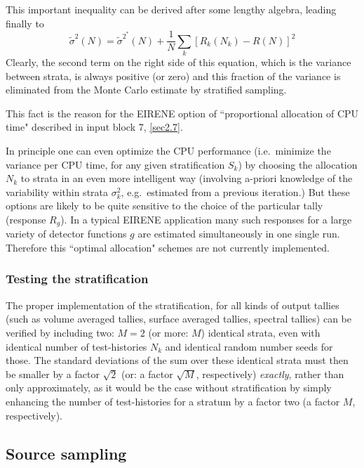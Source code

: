 This important inequality can be derived after some lengthy algebra, leading
finally to
\begin{equation}
  \tilde \sigma^{2}(N)=\tilde \sigma^{2^*}(N)+
  \frac{1}{N}\sum_k[ R_k(N_k)- R(N)]^2
\end{equation}
Clearly, the second term on
the right side of this equation, which is the variance between strata, is
always positive (or zero) and this fraction of the variance is eliminated from
the Monte Carlo estimate by stratified sampling.

This fact is the reason for the EIRENE option of ``proportional allocation of
CPU time" described in input block 7, \cref{sec2.7}.

In principle one can even optimize the CPU performance (i.e.\ minimize the
variance per CPU time, for any given stratification $S_k$) by choosing the
allocation $N_k$ to strata in an even more intelligent way (involving a-priori
knowledge of the variability within strata $\sigma^2_k$, e.g.\ estimated from a
previous iteration.)
But these options are likely to be quite sensitive to the choice of the
particular tally (response $R_g$).
In a typical EIRENE application many such responses for a large variety of
detector functions $g$ are estimated simultaneously in one single run.
Therefore this ``optimal allocation" schemes are not currently implemented.

\subsubsection{Testing the stratification}

The proper implementation of the stratification, for all kinds of output
tallies (such as volume averaged tallies, surface averaged tallies, spectral
tallies) can be verified by including two:  $M=2$ (or more: $M$) identical
strata, even with identical number of test-histories $N_k$ and identical random
number seeds for those.
The standard deviations of the sum over these identical strata must then be
smaller by a factor $\sqrt{2}$	    (or: a factor $\sqrt{M}$, respectively)
\emph{exactly}, rather than only approximately, as it would be the case without
stratification by simply enhancing the number of test-histories for a stratum
by a factor two (a factor $M$, respectively).

\subsection{Source sampling} \label{sec1.2.2}


